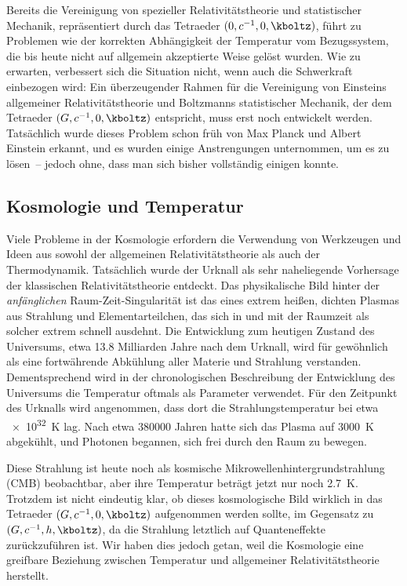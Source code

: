 
\newpage {}
\label{sec:1101}

Bereits die Vereinigung von spezieller Relativitätstheorie und statistischer Mechanik, repräsentiert durch das Tetraeder $(0,c^{-1},0,\kboltz)$, führt zu Problemen wie der korrekten Abhängigkeit der Temperatur vom Bezugssystem, die bis heute nicht auf allgemein akzeptierte Weise gelöst wurden. Wie zu erwarten, verbessert sich die Situation nicht, wenn auch die Schwerkraft einbezogen wird: Ein überzeugender Rahmen für die Vereinigung von Einsteins allgemeiner Relativitätstheorie und Boltzmanns statistischer Mechanik, der dem Tetraeder $(G,c^{-1},0,\kboltz)$ entspricht, muss erst noch entwickelt werden. Tatsächlich wurde dieses Problem schon früh von Max Planck und Albert Einstein erkannt, und es wurden einige Anstrengungen unternommen, um es zu lösen~-- jedoch ohne, dass man sich bisher vollständig einigen konnte.


\subsection*{Kosmologie und Temperatur}

Viele Probleme in der Kosmologie erfordern die Verwendung von Werkzeugen und Ideen aus sowohl der allgemeinen Relativitätstheorie als auch der Thermodynamik. Tatsächlich wurde der Urknall als sehr naheliegende Vorhersage der klassischen Relativitätstheorie entdeckt. Das physikalische Bild hinter der \emph{anfänglichen} Raum-Zeit-Singularität ist das eines extrem heißen, dichten Plasmas aus Strahlung und Elementarteilchen, das sich in und mit der Raumzeit als solcher extrem schnell ausdehnt. Die Entwicklung zum heutigen Zustand des Universums, etwa \num{13.8} Milliarden Jahre nach dem Urknall, wird für gewöhnlich als eine fortwährende Abkühlung aller Materie und Strahlung verstanden. Dementsprechend wird in der chronologischen Beschreibung der Entwicklung des Universums die Temperatur oftmals als Parameter verwendet. Für den Zeitpunkt des Urknalls wird angenommen, dass dort die Strahlungstemperatur bei etwa \qty{e32}{\kelvin} lag. Nach etwa \num{380000} Jahren hatte sich das Plasma auf \qty{3000}{\kelvin} abgekühlt, und Photonen begannen, sich frei durch den Raum zu bewegen.

Diese Strahlung ist heute noch als kosmische Mikrowellenhintergrundstrahlung (CMB) beobachtbar, aber ihre Temperatur beträgt jetzt nur noch \qty{2.7}{\kelvin}. Trotzdem ist nicht eindeutig klar, ob dieses kosmologische Bild wirklich in das Tetraeder $(G,c^{-1},0,\kboltz)$ aufgenommen werden sollte, im Gegensatz zu $(G,c^{-1},h,\kboltz)$, da die Strahlung letztlich auf Quanteneffekte zurückzuführen ist. Wir haben dies jedoch getan, weil die Kosmologie eine greifbare Beziehung zwischen Temperatur und allgemeiner Relativitätstheorie herstellt.
